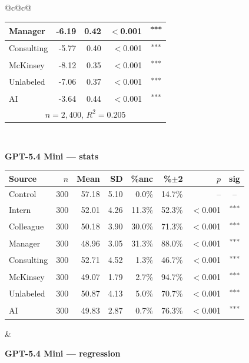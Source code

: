 \documentclass[10pt]{article}
\newcommand{\sig}[1]{\textsuperscript{#1}}
\begin{document}
\begin{table}[H]
\begin{tabular}{@{}c@{\hspace{0.5em}}c@{}}
\begin{minipage}[t]{0.49\textwidth}
\begin{tabular}{@{}l r r r c@{}}
Manager & -6.19 & 0.42 & $<$0.001 & \sig{***} \\
\midrule
Consulting & -5.77 & 0.40 & $<$0.001 & \sig{***} \\
McKinsey & -8.12 & 0.35 & $<$0.001 & \sig{***} \\
\midrule
Unlabeled & -7.06 & 0.37 & $<$0.001 & \sig{***} \\
AI & -3.64 & 0.44 & $<$0.001 & \sig{***} \\
\midrule
\multicolumn{5}{c}{\scriptsize $n=2{,}400$, $R^2=0.205$} \\
\bottomrule\end{tabular}
\end{minipage} \\[1.1em]
\begin{minipage}[t]{0.49\textwidth}\centering
\textbf{\footnotesize GPT-5.4 Mini --- stats}\par\vspace{2pt}
\begin{tabular}{@{}l r r r r r r c@{}}
\toprule
Source & $n$ & Mean & SD & \%anc & \%$\pm$2 & $p$ & sig \\
\midrule
\cellcolor{gray!22}Control & \cellcolor{gray!22}300 & \cellcolor{gray!22}57.18 & \cellcolor{gray!22}5.10 & \cellcolor{gray!22}0.0\% & \cellcolor{gray!22}14.7\% & \cellcolor{gray!22}-- & \cellcolor{gray!22}-- \\
\midrule
Intern & 300 & 52.01 & 4.26 & 11.3\% & 52.3\% & $<$0.001 & \sig{***} \\
Colleague & 300 & 50.18 & 3.90 & 30.0\% & 71.3\% & $<$0.001 & \sig{***} \\
Manager & 300 & 48.96 & 3.05 & 31.3\% & 88.0\% & $<$0.001 & \sig{***} \\
\midrule
Consulting & 300 & 52.71 & 4.52 & 1.3\% & 46.7\% & $<$0.001 & \sig{***} \\
McKinsey & 300 & 49.07 & 1.79 & 2.7\% & 94.7\% & $<$0.001 & \sig{***} \\
\midrule
Unlabeled & 300 & 50.87 & 4.13 & 5.0\% & 70.7\% & $<$0.001 & \sig{***} \\
AI & 300 & 49.83 & 2.87 & 0.7\% & 76.3\% & $<$0.001 & \sig{***} \\
\bottomrule\end{tabular}
\end{minipage} &
\begin{minipage}[t]{0.49\textwidth}\centering
\textbf{\footnotesize GPT-5.4 Mini --- regression}\par\vspace{2pt}
\begin{tabular}{@{}l r r r c@{}}

\end{tabular}
\end{minipage}
\end{tabular}
\end{table}
\end{document}
